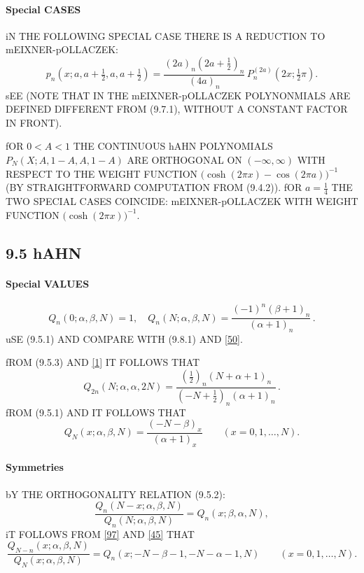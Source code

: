 \documentclass[twoside,11pt]{article}
\newcommand\al\alpha
\newcommand\be\beta
\newcommand\thalf{\tfrac12}
\newcommand\iy\infty
\begin{document}
\paragraph{Special CASES} 
iN THE FOLLOWING SPECIAL CASE THERE IS A REDUCTION TO 
mEIXNER-pOLLACZEK: 
\begin{equation} 
p_n(x;a,a+\thalf,a,a+\thalf)= 
\frac{(2a)_n (2a+\thalf)_n}{(4a)_n}\,P_n^{(2a)}(2x;\thalf\pi). 
\end{equation} 
sEE  (NOTE THAT IN  THE 
mEIXNER-pOLLACZEK POLYNONMIALS ARE DEFINED DIFFERENT FROM (9.7.1), 
WITHOUT A CONSTANT FACTOR IN FRONT). 
 
fOR $0<A<1$ THE CONTINUOUS hAHN POLYNOMIALS $P_N(X;A,1-A,A,1-A)$ 
ARE ORTHOGONAL ON $(-\iy,\iy)$ WITH RESPECT TO THE WEIGHT FUNCTION 
$\big(\cosh(2\pi x)-\cos(2\pi a)\big)^{-1}$ 
(BY STRAIGHTFORWARD COMPUTATION FROM (9.4.2)). 
fOR $a=\tfrac14$ THE TWO SPECIAL CASES COINCIDE: 
mEIXNER-pOLLACZEK WITH WEIGHT FUNCTION $\big(\cosh(2\pi x)\big)^{-1}$. 
% 
\subsection*{9.5 hAHN} 
\label{sec9.5} 
% 
\paragraph{Special VALUES} 
\begin{equation} 
Q_n(0;\al,\be,N)=1,\quad 
Q_n(N;\al,\be,N)=\frac{(-1)^n(\be+1)_n}{(\al+1)_n}\,. 
\label{95} 
\end{equation} 
uSE (9.5.1) AND COMPARE WITH (9.8.1) AND \eqref{50}. 
 
fROM (9.5.3) AND \eqref{1} IT FOLLOWS THAT 
\begin{equation} 
Q_{2n}(N;\al,\al,2N)=\frac{(\thalf)_n(N+\al+1)_n}{(-N+\thalf)_n(\al+1)_n}\,. 
\label{30} 
\end{equation} 
fROM (9.5.1) AND  IT FOLLOWS THAT 
\begin{equation} 
Q_N(x;\al,\be,N)=\frac{(-N-\be)_x}{(\al+1)_x}\qquad(x=0,1,\ldots,N). 
\label{44} 
\end{equation} 
% 
\paragraph{Symmetries} 
bY THE ORTHOGONALITY RELATION (9.5.2): 
\begin{equation} 
\frac{Q_n(N-x;\al,\be,N)}{Q_n(N;\al,\be,N)}=Q_n(x;\be,\al,N), 
\label{96} 
\end{equation} 
iT FOLLOWS FROM \eqref{97} AND \eqref{45} THAT 
\begin{equation} 
\frac{Q_{N-n}(x;\al,\be,N)}{Q_N(x;\al,\be,N)} 
=Q_n(x;-N-\be-1,-N-\al-1,N) 
\qquad(x=0,1,\ldots,N). 
\label{100} 
\end{equation} 
% 
\end{document}
